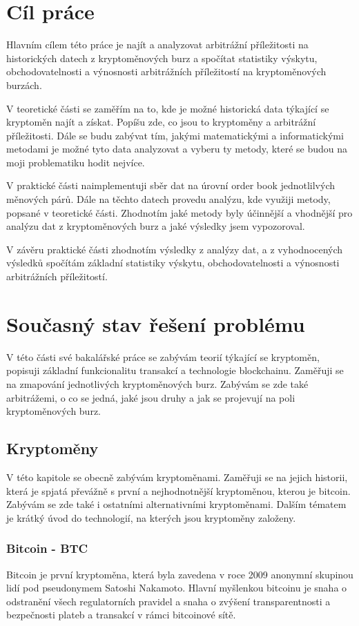 \documentclass[thesis=B,czech]{FITthesis}[2019/03/21]
\begin{document}
\chapter{Cíl práce}
Hlavním cílem této práce je najít a analyzovat arbitrážní příležitosti na historických datech z kryptoměnových burz a spočítat statistiky výskytu, obchodovatelnosti a výnosnosti arbitrážních příležitostí na kryptoměnových burzách. 

V teoretické části se zaměřím na to, kde je možné historická data týkající se kryptoměn najít a získat. Popíšu zde, co jsou to kryptoměny a arbitrážní příležitosti. Dále se budu zabývat tím, jakými matematickými a informatickými metodami je možné tyto data analyzovat a vyberu ty metody, které se budou na moji problematiku hodit nejvíce.

V praktické části naimplementuji sběr dat na úrovní order book jednotlilvých měnových párů. Dále na těchto datech provedu analýzu, kde využiji metody, popsané v teoretické části. Zhodnotím jaké metody byly účinnější a vhodnější pro analýzu dat z kryptoměnových burz a jaké výsledky jsem vypozoroval.

V závěru praktické části zhodnotím výsledky z analýzy dat, a z vyhodnocených výsledků spočítám základní statistiky výskytu, obchodovatelnosti a výnosnosti arbitrážních příležitostí. 

\chapter{Současný stav řešení problému}
V této části své bakalářské práce se zabývám teorií týkající se kryptoměn, popisuji základní funkcionalitu transakcí a technologie blockchainu. Zaměřuji se na zmapování jednotlivých kryptoměnových burz. Zabývám se zde také arbitrážemi, o co se jedná, jaké jsou druhy a jak se projevují na poli kryptoměnových burz.

\section{Kryptoměny}
V této kapitole se obecně zabývám kryptoměnami. Zaměřuji se na jejich historii, která je spjatá převážně s první a nejhodnotnější kryptoměnou, kterou je bitcoin. Zabývám se zde také i ostatními alternativními kryptoměnami. 
Dalším tématem je krátký úvod do technologií, na kterých jsou kryptoměny založeny. \cite{BudoucnostFinTrhu}

\subsection{Bitcoin - BTC}
Bitcoin je první kryptoměna, která byla zavedena v roce 2009 anonymní skupinou lidí pod pseudonymem Satoshi Nakamoto. Hlavní myšlenkou bitcoinu je snaha o odstranění všech regulatorních pravidel a snaha o zvýšení transparentnosti a bezpečnosti plateb a transakcí v rámci bitcoinové sítě. \cite{Finex}
\end{document}
